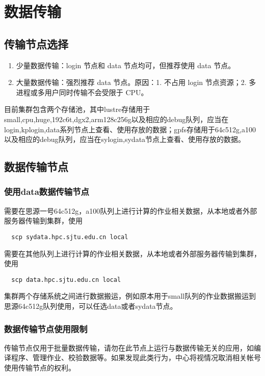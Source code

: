 \documentclass[cn, 12pt, hang, black, chinese]{elegantbook}
\begin{document}
\chapter{数据传输}

\section{传输节点选择}
\begin{enumerate}
\item 少量数据传输：login 节点和 data 节点均可，但推荐使用 data 节点。
\item 大量数据传输：强烈推荐 data 节点。原因：1. 不占用 login 节点资源；2. 多进程或多用户同时传输不会受限于 CPU。
\end{enumerate}

    目前集群包含两个存储池，其中lustre存储用于small,cpu,huge,192c6t,dgx2,arm128c256g以及相应的debug队列，应当在login,kplogin,data系列节点上查看、使用存放的数据；gpfs存储用于64c512g,a100以及相应的debug队列，应当在sylogin,sydata节点上查看、使用存放的数据。

\section{数据传输节点}

\subsection*{使用data数据传输节点}
需要在思源一号64c512g，a100队列上进行计算的作业相关数据，从本地或者外部服务器传输到集群，使用
\begin{lstlisting}
  scp sydata.hpc.sjtu.edu.cn local
\end{lstlisting}

    需要在其他队列上进行计算的作业相关数据，从本地或者外部服务器传输到集群，使用
\begin{lstlisting}
  scp data.hpc.sjtu.edu.cn local
\end{lstlisting}

    集群两个存储系统之间进行数据搬运，例如原本用于small队列的作业数据搬运到思源64c512g队列使用，可以任选data或者sydata节点。

\subsection*{数据传输节点使用限制}
传输节点仅用于批量数据传输，请勿在此节点上运行与数据传输无关的应用，如编译程序、管理作业、校验数据等。如果发现此类行为，中心将视情况取消相关帐号使用传输节点的权利。
\end{document}
